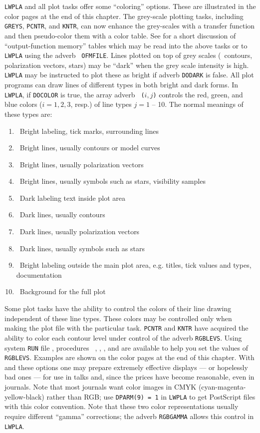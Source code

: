 {\tt LWPLA} and all plot tasks offer some ``coloring'' options.  These
are illustrated in the color pages at the end of this chapter.  The
grey-scale plotting tasks, including {\tt GREYS}, {\tt PCNTR}, and
{\tt KNTR}, can now enhance the grey-scales with a transfer function
and then pseudo-color them with a color table.  See  for
a short discussion of ``output-function memory'' tables which may be
read into the above tasks or to {\tt LWPLA} using the adverb {\tt
OFMFILE}\@.  Lines plotted on top of grey scales (\eg\ contours,
polarization vectors, stars) may be ``dark'' when the grey scale
intensity is high.  {\tt LWPLA} may be instructed to plot these as
bright if adverb {\tt DODARK} is false.  All plot programs can draw
lines of different types in both bright and dark forms.  In {\tt
LWPLA}, if {\tt DOCOLOR} is true, the array adverb {\tt
{}($i,j$)} controls the red, green, and blue colors ($i =
1,2,3$, resp.) of line types $j= 1$ -- 10.  The normal meanings of
these types are:
\begin{enumerate}
\item\ Bright labeling, tick marks, surrounding lines
\item\ Bright lines, usually contours or model curves
\item\ Bright lines, usually polarization vectors
\item\ Bright lines, usually symbols such as stars, visibility samples
\item\ Dark labeling text inside plot area
\item\ Dark lines, usually contours
\item\ Dark lines, usually polarization vectors
\item\ Dark lines, usually symbols such as stars
\item\ Bright labeling outside the main plot area, e.g. titles, tick
      values and types, documentation
\item\ Background for the full plot
\end{enumerate}
Some plot tasks have the ability to control the colors of their line
drawing independent of these line types.  These colors may be
controlled only when making the plot file with the particular task.
{\tt PCNTR} and {\tt KNTR} have acquired the ability to color each
contour level under control of the adverb {\tt RGBLEVS}\@.  Using
system {\tt RUN} file {\tt {}}, procedures {\tt
{}}, {\tt {}}, {\tt {}}, and
{\tt {}} are available to help you set the values of {\tt
RGBLEVS}\@.  Examples are shown on the color pages at the end of this
chapter.  With {\tt {}} and these options one may prepare
extremely effective displays --- or hopelessly bad ones --- for use in
talks and, since the prices have become reasonable, even in journals.
Note that most journals want color images in CMYK
(cyan-magenta-yellow-black) rather than RGB; use {\tt DPARM(9) = 1} in
{\tt LWPLA} to get PostScript files with this color convention.  Note
that these two color representations usually require different
``gamma'' corrections; the adverb {\tt RGBGAMMA} allows this control
in {\tt LWPLA}\@.

